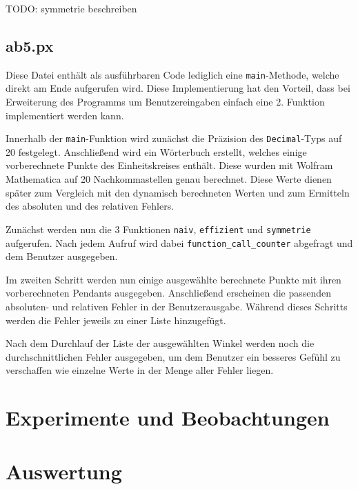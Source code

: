 \documentclass{scrartcl}
\begin{document}
	TODO: symmetrie beschreiben
	
	\subsection{ab5.px}
	
	Diese Datei enthält als ausführbaren Code lediglich eine \verb|main|-Methode, welche direkt am Ende aufgerufen wird. Diese Implementierung hat den Vorteil, dass bei Erweiterung des Programms um Benutzereingaben einfach eine 2. Funktion implementiert werden kann.
	
	Innerhalb der \verb|main|-Funktion wird zunächst die Präzision des \verb|Decimal|-Typs auf 20 festgelegt. Anschließend wird ein Wörterbuch erstellt, welches einige vorberechnete Punkte des Einheitskreises enthält. Diese wurden mit Wolfram Mathematica auf 20 Nachkommastellen genau berechnet. Diese Werte dienen später zum Vergleich mit den dynamisch berechneten Werten und zum Ermitteln des absoluten und des relativen Fehlers.
	
	Zunächst werden nun die 3 Funktionen \verb|naiv|, \verb|effizient| und \verb|symmetrie| aufgerufen. Nach jedem Aufruf wird dabei \verb|function_call_counter| abgefragt und dem Benutzer ausgegeben.
	
	Im zweiten Schritt werden nun einige ausgewählte berechnete Punkte mit ihren vorberechneten Pendants ausgegeben. Anschließend erscheinen die passenden absoluten- und relativen Fehler in der Benutzerausgabe. Während dieses Schritts werden die Fehler jeweils zu einer Liste hinzugefügt.
	
	Nach dem Durchlauf der Liste der ausgewählten Winkel werden noch die durchschnittlichen Fehler ausgegeben, um dem Benutzer ein besseres Gefühl zu verschaffen wie einzelne Werte in der Menge aller Fehler liegen.
	
	
	
	\section{Experimente und Beobachtungen}
	
	
	
	\section{Auswertung}	
	
\end{document}
